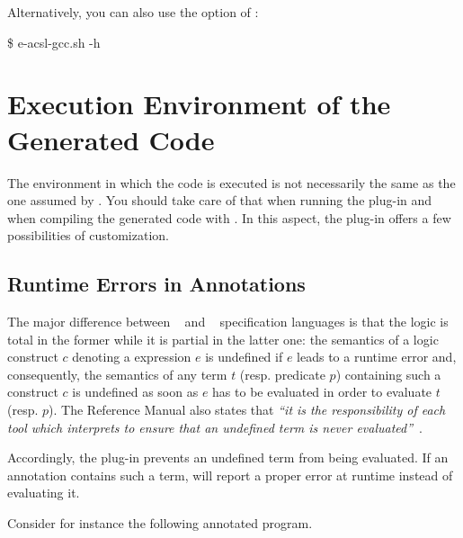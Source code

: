 Alternatively, you can also use the  option of \eacslgcc:

\begin{shell}
\$ e-acsl-gcc.sh -h
\end{shell}

\section{Execution Environment of the Generated Code} %
\label{sec:exec-env}

The environment in which the code is executed is not necessarily the same as
the one assumed by \framac. You should take care of that when running the \eacsl
plug-in and when compiling the generated code with \gcc. In this aspect, the
plug-in offers a few possibilities of customization.


\subsection{Runtime Errors in Annotations}
\label{sec:runtime-error}

The major difference between \acsl~\cite{acsl} and \eacsl~\cite{eacsl}
specification languages is that the logic is total in the former while it is
partial in the latter one: the semantics of a logic construct $c$ denoting a \C
expression $e$
is undefined if $e$ leads to a runtime error and, consequently, the semantics of
any term $t$ (resp. predicate $p$) containing such a construct $c$ is
undefined as soon as $e$ has to be evaluated in order to evaluate $t$
(resp. $p$). The \eacsl Reference Manual also states that \emph{``it is the
  responsibility of each tool which interprets \eacsl to ensure that an
  undefined term is never evaluated''}~\cite{eacsl}.

Accordingly, the \eacsl plug-in prevents an undefined term from being
evaluated. If an annotation contains such a term, \eacsl will report a proper
error at runtime instead of evaluating it.

Consider for instance the following annotated program.


